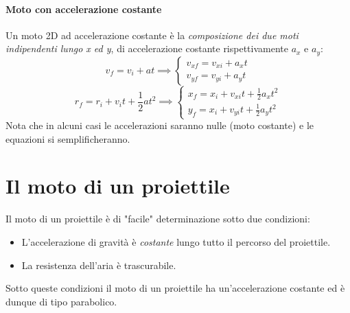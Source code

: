 \documentclass[12pt, a4paper, openany]{book}
\begin{document}
\paragraph*{Moto con accelerazione costante}
Un moto 2D ad accelerazione costante è la \emph{composizione dei due moti indipendenti lungo x ed y}, di accelerazione costante rispettivamente $a_x$ e $a_y$:
$$ v_f = v_i + at \implies \begin{cases}
        v_{xf} = v_{xi} +a_xt \\
        v_{yf} = v_{yi} +a_yt
    \end{cases}
$$
$$ r_f = r_i + v_it + \frac{1}{2}at^2 \implies \begin{cases}
        x_f = x_i + v_{xi}t + \frac{1}{2}a_xt^2 \\
        y_f = x_i + v_{yi}t + \frac{1}{2}a_yt^2
    \end{cases}$$
Nota che in alcuni casi le accelerazioni saranno nulle (moto costante) e le equazioni si semplificheranno.

\section{Il moto di un proiettile}
Il moto di un proiettile è di "facile" determinazione sotto due condizioni:
\begin{itemize}
    \item L'accelerazione di gravità è \emph{costante} lungo tutto il percorso del proiettile.
    \item La resistenza dell'aria è trascurabile.
\end{itemize}
Sotto queste condizioni il moto di un proiettile ha un'accelerazione costante ed è dunque di tipo parabolico.
\end{document}
